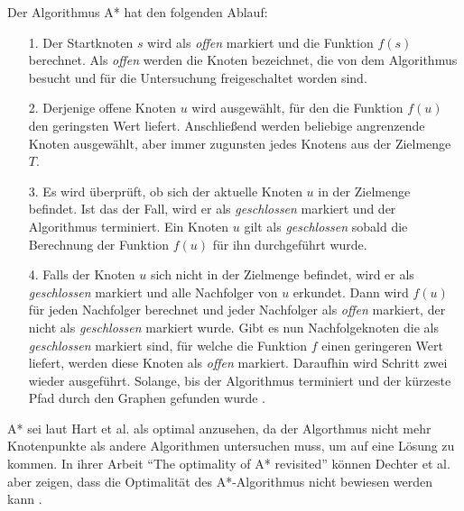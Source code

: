 Der Algorithmus A* hat den folgenden Ablauf:
\begin{itemize}
\item[1.] Der Startknoten $s$ wird als \textit{offen} markiert und die Funktion $f(s)$ berechnet. Als \textit{offen} werden die Knoten bezeichnet, die von dem Algorithmus besucht und für die Untersuchung freigeschaltet worden sind.
\item[2.] Derjenige offene Knoten $u$ wird ausgewählt, für den die Funktion $f(u)$
den geringsten Wert liefert. Anschließend werden beliebige angrenzende Knoten ausgewählt, aber immer zugunsten jedes Knotens aus der Zielmenge $T$.
\item[3.] Es wird überprüft, ob sich der aktuelle Knoten $u$ in der Zielmenge befindet. Ist das der Fall, wird er als \textit{geschlossen} markiert und der Algorithmus terminiert. Ein Knoten $u$ gilt als \textit{geschlossen} sobald die Berechnung der Funktion $f(u)$ für ihn durchgeführt wurde.
\item[4.]
Falls der Knoten $u$ sich nicht in der Zielmenge befindet, wird er als \textit{geschlossen} markiert und alle Nachfolger von $u$ erkundet. Dann wird $f(u)$ für jeden Nachfolger berechnet und jeder Nachfolger als \textit{offen} markiert, der nicht als \textit{geschlossen} markiert wurde. Gibt es nun Nachfolgeknoten die als \textit{geschlossen} markiert sind, für welche die Funktion $f$ einen geringeren Wert liefert, werden diese Knoten als \textit{offen} markiert. Daraufhin wird Schritt zwei wieder ausgeführt. Solange, bis der Algorithmus terminiert und der kürzeste Pfad durch den Graphen gefunden wurde \cite{HartNilssonandRaphael.1968}.
\end{itemize}

A* sei laut Hart et al. \cite{HartNilssonandRaphael.1968} als optimal anzusehen, da der Algorthmus nicht mehr Knotenpunkte als andere Algorithmen untersuchen muss, um auf eine Lösung zu kommen. In ihrer Arbeit ``The optimality of A* revisited'' können Dechter et al. aber zeigen, dass die Optimalität des A*-Algorithmus nicht bewiesen werden kann \cite{RinaDechterandJudeaPearl.1983}.
